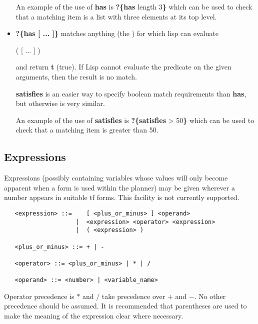 \begin{itemize}
An example of the use of {\bf has} is {\bf ?\{has} length 3{\bf \}}
which can be used to check that a matching item is a list with three
elements at its top level.

\item
{}
{\bf ?\{has  [ ... ]\}}
matches anything (the ) for which lisp can evaluate

( 
[ ... ] )

and return {\bf t} (true).  If Lisp cannot evaluate the predicate on the given
arguments, then the result is no match.

{\bf satisfies} is an easier way to specify boolean match requirements
than {\bf has}, but otherwise is very similar.

An example of the use of {\bf satisfies} is {\bf ?\{satisfies} > 50{\bf \}}
which can be used to check that a matching item is greater than 50.

\end{itemize}

\subsection{Expressions}

Expressions (possibly containing variables whose values
will only become apparent when a form is used within the planner)
may be given wherever a number appears in suitable {\sc tf} forms.
This facility is not currently supported.

\begin{verbatim}
   <expression> ::=    [ <plus_or_minus> ] <operand>
                    |  <expression> <operator> <expression>
                    |  ( <expression> )

   <plus_or_minus> ::= + | -

   <operator> ::= <plus_or_minus> | * | /

   <operand> ::= <number> | <variable_name>
\end{verbatim}
 
  

Operator precedence is $*$ and $/$ take precedence over $+$ and $-$.  No
other precedence should be assumed.  It is recommended that parentheses
are used to make the meaning of the expression clear where necessary.

